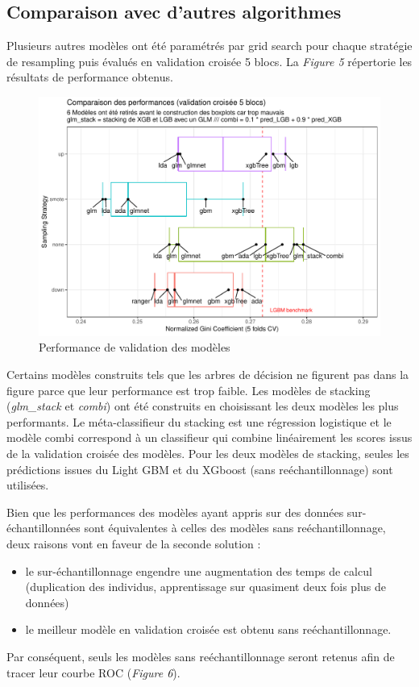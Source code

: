 \documentclass[french]{article}
\begin{document}
\begin{multicols}{2}
\subsection{Comparaison avec d'autres algorithmes}

Plusieurs autres modèles ont été paramétrés par \og grid search \fg{} pour chaque stratégie de resampling puis évalués en validation croisée 5 blocs. La \emph{Figure 5} répertorie les résultats de performance obtenus.

\begin{figure}[H] \centering
  \includegraphics[width = \columnwidth]{img/results}
  \caption{Performance de validation des modèles}
\end{figure}

Certains modèles construits tels que les arbres de décision ne figurent pas dans la figure parce que leur performance est trop faible. Les modèles de stacking (\emph{glm\_stack} et \emph{combi}) ont été construits en choisissant les deux modèles les plus performants. Le méta-classifieur du stacking est une régression logistique et le modèle \og combi \fg{} correspond à un classifieur qui combine linéairement les scores issus de la validation croisée des modèles. Pour les deux modèles de stacking, seules les prédictions issues du Light GBM et du XGboost (sans reéchantillonnage) sont utilisées.

Bien que les performances des modèles ayant appris sur des données sur-échantillonnées sont équivalentes à celles des modèles sans reéchantillonnage, deux raisons vont en faveur de la seconde solution :
\begin{itemize}
    \item le sur-échantillonnage engendre une augmentation des temps de calcul (duplication des individus, apprentissage sur quasiment deux fois plus de données)
    \item le meilleur modèle en validation croisée est obtenu sans reéchantillonnage.
\end{itemize}
Par conséquent, seuls les modèles sans reéchantillonnage seront retenus afin de tracer leur courbe ROC (\emph{Figure 6}).


\end{multicols}
\end{document}
